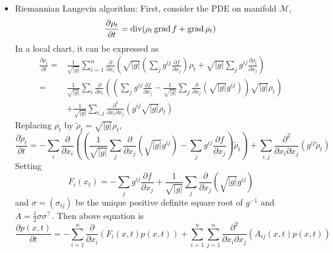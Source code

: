 \documentclass[a4paper,12pt]{article}
\begin{document}
\begin{itemize}
  \item Riemannian Langevin algorithm: First, consider the PDE on manifold $\mathcal{M}$,
  \begin{equation*}
    \frac{\partial \rho_t}{\partial t} = \operatorname{div} (\rho_t \operatorname{grad}f + \operatorname{grad}\rho_t)
  \end{equation*}
  In a local chart, it can be expressed as
  \begin{equation*}
    \begin{aligned}
      \frac{\partial \rho_t}{\partial t}= & \frac{1}{\sqrt{|g|}} \sum_{i=1}^n \frac{\partial}{\partial x_i}\left(\sqrt{|g|}\left(\sum_j g^{i j} \frac{\partial f}{\partial x_j}\right) \rho_t+\sqrt{|g|} \sum_j g^{i j} \frac{\partial \rho_t}{\partial x_j}\right) \\
      = & \frac{1}{\sqrt{|g|}} \sum_i \frac{\partial}{\partial x_i}\left(\left(\sum_j g^{i j} \frac{\partial f}{\partial x_j}-\frac{1}{\sqrt{|g|}} \sum_j \frac{\partial}{\partial x_j}\left(\sqrt{|g|} g^{i j}\right)\right) \sqrt{|g|} \rho_t\right) \\
      & +\frac{1}{\sqrt{|g|}} \sum_{i, j} \frac{\partial^2}{\partial x_i \partial x_j}\left(g^{i j} \sqrt{|g|} \rho_t\right)
    \end{aligned}
  \end{equation*}
  Replacing $\rho_t$ by $\tilde{\rho}_t=\sqrt{|g|} \rho_t$,
  \begin{equation*}
    \frac{\partial \tilde{\rho}_t}{\partial t}=-\sum_i \frac{\partial}{\partial x_i}\left(\left(\frac{1}{\sqrt{|g|}} \sum_j \frac{\partial}{\partial x_j}\left(\sqrt{|g|} g^{i j}\right)-\sum_j g^{i j} \frac{\partial f}{\partial x_j}\right) \tilde{\rho}_t\right)+\sum_{i, j} \frac{\partial^2}{\partial x_i \partial x_j}\left(g^{i j} \tilde{\rho}_t\right)
  \end{equation*}
  Setting
  \begin{equation*}
    F_i\left(x_t\right)=-\sum_j g^{i j} \frac{\partial f}{\partial x_j}+\frac{1}{\sqrt{|g|}} \sum_j \frac{\partial}{\partial x_j}\left(\sqrt{|g|} g^{i j}\right)
  \end{equation*}
  and $\sigma = (\sigma_{ij})$ be the unique positive definite square root of $g^{-1}$ and $A=\frac{1}{2} \sigma \sigma^{\top}$. Then above equation is
  \begin{equation*}
    \frac{\partial p(x, t)}{\partial t}=-\sum_{i=1}^n \frac{\partial}{\partial x_i}\left(F_i(x, t) p(x, t)\right)+\sum_{i=1}^n \sum_{j=1}^n \frac{\partial^2}{\partial x_i \partial x_j}\left(A_{i j}(x, t) p(x, t)\right)
  \end{equation*}

\end{itemize}
\end{document}
